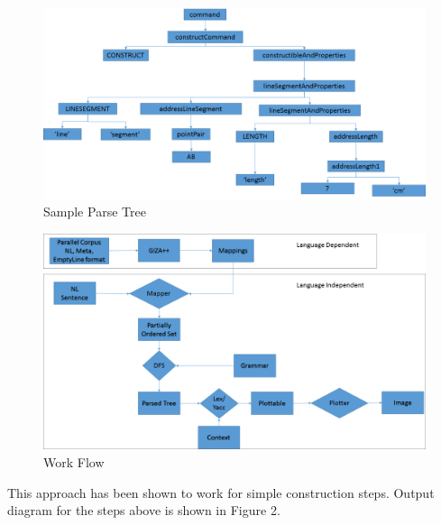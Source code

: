 \def\DevnagVersion{2.15}\documentclass[12pt]{article}
\begin{document}
\begin{figure}[H]
  \begin{center}
    \includegraphics[scale=0.5]{parsetree.png}
  \end{center}
  \caption{Sample Parse Tree}
  \label{fig:pspic}
\end{figure}
\begin{figure}[H]
  \begin{center}
    \includegraphics[scale=0.5]{workflow.png}
  \end{center}
  \caption{Work Flow}
  \label{fig:pspic}
\end{figure}

This approach has been shown to work for simple construction steps. Output diagram for the steps above is shown in Figure 2.
\end{document}

